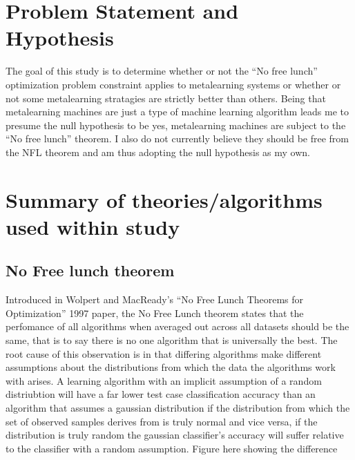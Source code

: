 \documentclass[a4paper,11pt]{article}
\begin{document}
\section{Problem Statement and Hypothesis}
  The goal of this study is to determine whether or not the ``No free lunch'' optimization problem
  constraint applies to metalearning systems or whether or not some metalearning stratagies are strictly
  better than others. Being that metalearning machines are just a type of machine learning algorithm
  leads me to presume the null hypothesis to be yes, metalearning machines are subject to the
  ``No free lunch'' theorem. I also do not currently believe they should be free from the NFL theorem
  and am thus adopting the null hypothesis as my own.

\section{Summary of theories/algorithms used within study}
\subsection{No Free lunch theorem}
Introduced in Wolpert and MacReady's ``No Free Lunch Theorems for Optimization'' 1997 paper,
the No Free Lunch theorem states that the perfomance of all algorithms when averaged out across all
  datasets should be the same, that is to say there is no one algorithm that is universally the best.
  The root cause of this observation is in that differing algorithms make different assumptions about the
  distributions from which the data the algorithms work with arises. A learning algorithm with an implicit
  assumption of a random distriubtion will have a far lower test case classification accuracy than an
  algorithm that assumes a gaussian distribution if the distribution from which the set of observed
  samples derives from is truly normal and vice versa, if the distribution is truly random the gaussian
  classifier's accuracy will suffer relative to the classifier with a random assumption. {Figure here
    showing the difference}
\end{document}
